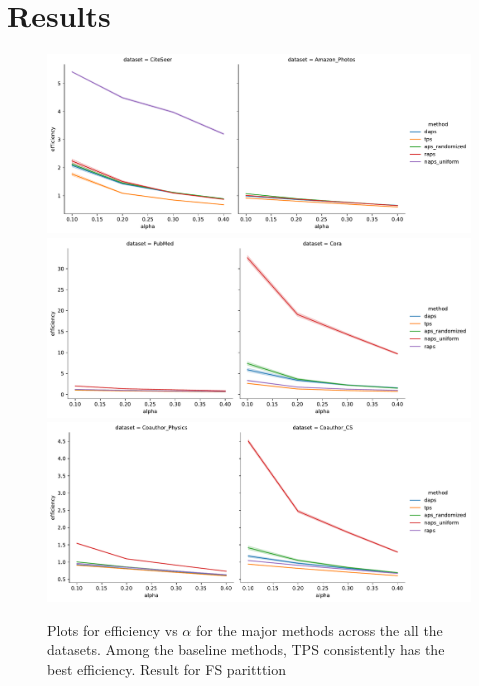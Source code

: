
\section{Results}


\begin{figure}
    \centering
    \includegraphics[width=\linewidth]{graphConformal/figures/split/small_datasets_efficiency.pdf}
    \includegraphics[width=\linewidth]{graphConformal/figures/split/med_1_datasets_efficiency.pdf}
    \includegraphics[width=\linewidth]{graphConformal/figures/split/med_2_datasets_efficiency.pdf}
    \caption{Plots for efficiency vs $\alpha$ for the major methods across the all the datasets. Among the baseline methods, TPS consistently has the best efficiency. Result for FS paritttion}
    \label{fig:fs:conformal:efficiency_vs_alpha}
\end{figure}

